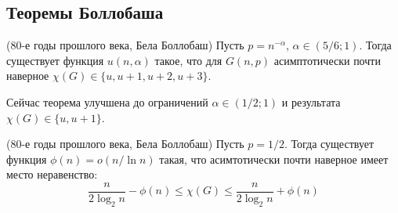 \subsection{Теоремы Боллобаша}

\begin{theorem} (80-е годы прошлого века, Бела Боллобаш)
	Пусть $p = n^{-\alpha}$, $\alpha \in (5 / 6; 1)$. Тогда существует функция $u(n, \alpha)$ такое, что для $G(n, p)$ асимптотически почти наверное $\chi(G) \in \{u, u + 1, u + 2, u + 3\}$.
\end{theorem}

\begin{note}
	Сейчас теорема улучшена до ограничений $\alpha \in (1 / 2; 1)$ и результата $\chi(G) \in \{u, u + 1\}$.
\end{note}

\begin{theorem} (80-е годы прошлого века, Бела Боллобаш)
	Пусть $p = 1 / 2$. Тогда существует функция $\phi(n) = o(n / \ln n)$ такая, что асимтотически почти наверное имеет место неравенство:
	\[
		\frac{n}{2\log_2 n} - \phi(n) \le \chi(G) \le \frac{n}{2\log_2 n} + \phi(n)
	\]
\end{theorem}

